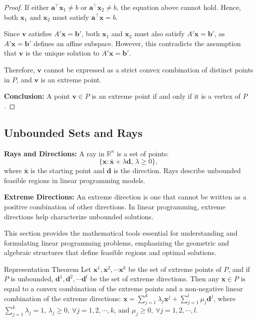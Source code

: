 \begin{proof}
If either \( \mathbf{a}^\top\mathbf{x}_1 \neq b \) or \( \mathbf{a}^\top\mathbf{x}_2 \neq b\), the equation above cannot hold. Hence, both \( \mathbf{x}_1 \) and \( \mathbf{x}_2 \) must satisfy \( \mathbf{a}^\top\mathbf{x} = b \).


Since \( \mathbf{v} \) satisfies \( A'\mathbf{x} = \mathbf{b}' \), both \( \mathbf{x}_1 \) and \( \mathbf{x}_2 \) must also satisfy \( A'\mathbf{x} = \mathbf{b}' \), as \( A'\mathbf{x} = \mathbf{b}' \) defines an affine subspace. However, this contradicts the assumption that \( \mathbf{v} \) is the unique solution to \( A'\mathbf{x} = \mathbf{b}' \).

Therefore, \( \mathbf{v} \) cannot be expressed as a strict convex combination of distinct points in \( P \), and \( \mathbf{v} \) is an extreme point.

\textbf{Conclusion:} A point \( \mathbf{v} \in P \) is an extreme point if and only if it is a vertex of \( P \).
\end{proof}



\subsection{Unbounded Sets and Rays}

\textbf{Rays and Directions:}  
A ray in \(\mathbb{R}^n\) is a set of points:
\[
\{\mathbf{x} : \mathbf{\bar x} + \lambda \mathbf{d}, \, \lambda \geq 0\},
\]
where \(\mathbf{\bar x}\) is the starting point and \(\mathbf{d}\) is the direction. Rays describe unbounded feasible regions in linear programming models.

\textbf{Extreme Directions:}  
An extreme direction is one that cannot be written as a positive combination of other directions. In linear programming, extreme directions help characterize unbounded solutions.

\medskip  
This section provides the mathematical tools essential for understanding and formulating linear programming problems, emphasizing the geometric and algebraic structures that define feasible regions and optimal solutions.

\begin{theorem}{Representation Theorem}{}
\label{thm:representation}
 Let  $\mathbf{x}^1, \mathbf{x}^2,\cdots \mathbf{x}^k$ be the set of extreme points of $P$, and if $P$ is unbounded, $\mathbf{d}^1, \mathbf{d}^2,\cdots \mathbf{d}^l$ be the set of extreme directions. Then any $\mathbf{x} \in P$ is equal to a convex combination of the extreme points and a non-negative linear combination of the extreme directions: $\mathbf{x} = \sum_{j=1}^k \lambda_j \mathbf{x}^j + \sum_{j=1}^l \mu_j \mathbf{d}^j$, where $\sum_{j=1}^k \lambda_j = 1$, $\lambda_j \ge 0,~\forall  j=1,2,\cdots,k$, and $\mu_j \ge 0,~\forall j=1,2,\cdots,l$.
 \end{theorem}


